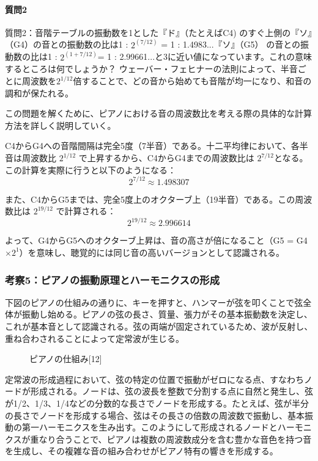 \documentclass{article}
\begin{document}
\begin{spacing}{1.2}
    \paragraph*{質問2}質問2：音階テーブルの振動数を1とした『ド』（たとえばC4) のすぐ上側の『ソ』（G4）の音との振動数の比は1 : $2^(7/12)$ = 1 : 1.4983...『ソ』（G5） の音との振動数の比は1 : $2^(1 + 7/12)$= 1 : 2.99661...と3に近い値になっています。これの意味するところは何でしょうか？ 
    ウェーバー・フェヒナーの法則によって、半音ごとに周波数を$2^{1/12}$倍することで、どの音から始めても音階が均一になり、和音の調和が保たれる。

    この問題を解くために、ピアノにおける音の周波数比を考える際の具体的な計算方法を詳しく説明していく。

    C4からG4への音階間隔は完全5度（7半音）である。十二平均律において、各半音は周波数比 $2^{1/12}$ で上昇するから、C4からG4までの周波数比は $2^{7/12}$となる。この計算を実際に行うと以下のようになる：
    \[2^{7/12} \approx 1.498307\]

    また、C4からG5までは、完全5度上のオクターブ上（19半音）である。この周波数比は $2^{19/12}$ で計算される：
    \[2^{19/12} \approx 2.996614\]

    よって、G4からG5へのオクターブ上昇は、音の高さが倍になること（G5 = G4 $\times 2^{1}$）を意味し、聴覚的には同じ音の高いバージョンとして認識される。
\end{spacing}

\subsubsection{考察5：ピアノの振動原理とハーモニクスの形成}
\begin{spacing}{1.2}
    下図のピアノの仕組みの通りに、キーを押すと、ハンマーが弦を叩くことで弦全体が振動し始める。ピアノの弦の長さ、質量、張力がその基本振動数を決定し、これが基本音として認識される。弦の両端が固定されているため、波が反射し、重ね合わされることによって定常波が生じる。
    \begin{figure}[ht] %
        \centering
        \caption{ピアノの仕組み[12]}
    \end{figure}
    \FloatBarrier
    定常波の形成過程において、弦の特定の位置で振動がゼロになる点、すなわちノードが形成される。ノードは、弦の波長を整数で分割する点に自然と発生し、弦が1/2、1/3、1/4などの分数的な長さでノードを形成する。たとえば、弦が半分の長さでノードを形成する場合、弦はその長さの倍数の周波数で振動し、基本振動の第一ハーモニクスを生み出す。このようにして形成されるノードとハーモニクスが重なり合うことで、ピアノは複数の周波数成分を含む豊かな音色を持つ音を生成し、その複雑な音の組み合わせがピアノ特有の響きを形成する。
\end{spacing}
\end{document}
